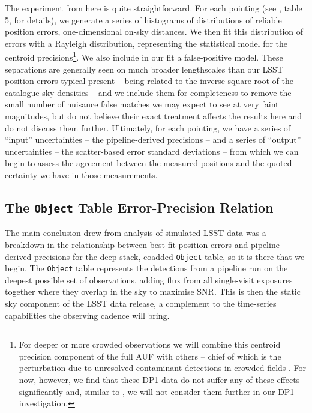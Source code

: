 \documentclass[SE,lsstdraft,authoryear,toc]{lsstdoc}
\begin{document}
The experiment from here is quite straightforward.
For each pointing (see \citealp{Guy2025}, table 5, for details), we generate a series of histograms of distributions of reliable position errors, one-dimensional on-sky distances.
We then fit this distribution of errors with a Rayleigh distribution, representing the statistical model for the centroid precisions\footnote{For deeper or more crowded observations we will combine this centroid precision component of the full AUF with others -- chief of which is the perturbation due to unresolved contaminant detections in crowded fields \citep{2018MNRAS.481.2148W}. For now, however, we find that these DP1 data do not suffer any of these effects significantly and, similar to \citet{sitcomtn-159}, we will not consider them further in our DP1 investigation.}.
We also include in our fit a false-positive model.
These separations are generally seen on much broader lengthscales than our LSST position errors typical present -- being related to the inverse-square root of the catalogue sky densities -- and we include them for completeness to remove the small number of nuisance false matches we may expect to see at very faint magnitudes, but do not believe their exact treatment affects the results here and do not discuss them further.
Ultimately, for each pointing, we have a series of ``input'' uncertainties -- the pipeline-derived precisions -- and a series of ``output'' uncertainties -- the scatter-based error standard deviations -- from which we can begin to assess the agreement between the measured positions and the quoted certainty we have in those measurements.

\subsection{The \texttt{Object} Table Error-Precision Relation}
\label{sec:object-err-precision}
The main conclusion \citet{sitcomtn-159} drew from analysis of simulated LSST data was a breakdown in the relationship between best-fit position errors and pipeline-derived precisions for the deep-stack, coadded \texttt{Object} table, so it is there that we begin.
The \texttt{Object} table represents the detections from a pipeline run on the deepest possible set of observations, adding flux from all single-visit exposures together where they overlap in the sky to maximise SNR.
This is then the static sky component of the LSST data release, a complement to the time-series capabilities the observing cadence will bring.
\end{document}
